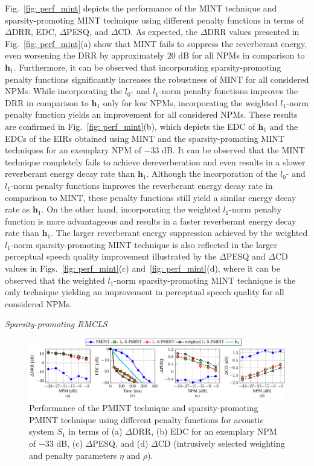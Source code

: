 \documentclass[10pt]{IEEEtran}
\begin{document}
Fig.~\ref{fig: perf_mint} depicts the performance of the MINT technique and sparsity-promoting MINT technique using different penalty functions in terms of $\Delta$DRR, EDC, $\Delta$PESQ, and $\Delta$CD. 
As expected, the $\Delta$DRR values presented in Fig.~\ref{fig: perf_mint}(a) show that MINT fails to suppress the reverberant energy, even worsening the DRR by approximately $20$ dB for all NPMs in comparison to $\mathbf{h}_1$. 
Furthermore, it can be observed that incorporating sparsity-promoting penalty functions significantly increases the robustness of MINT for all considered NPMs.
While incorporating the $l_0$- and $l_1$-norm penalty functions improves the DRR in comparison to $\mathbf{h}_1$ only for low NPMs, incorporating the weighted $l_1$-norm penalty function yields an improvement for all considered NPMs.
These results are confirmed in Fig.~\ref{fig: perf_mint}(b), which depicts the EDC of $\mathbf{h}_1$ and the EDCs of the EIRs obtained using MINT and the sparsity-promoting MINT techniques for an exemplary NPM of $-33$ dB.
It can be observed that the MINT technique completely fails to achieve dereverberation and even results in a slower reverberant energy decay rate than $\mathbf{h}_1$. 
Although the incorporation of the $l_0$- and $l_1$-norm penalty functions improves the reverberant energy decay rate in comparison to MINT, these penalty functions still yield a similar energy decay rate as $\mathbf{h}_1$.
On the other hand, incorporating the weighted $l_1$-norm penalty function is more advantageous and results in a faster reverberant energy decay rate than $\mathbf{h}_1$.
The larger reverberant energy suppression achieved by the weighted $l_1$-norm sparsity-promoting MINT technique is also reflected in the larger perceptual speech quality improvement illustrated by the $\Delta$PESQ and $\Delta$CD values in Figs.~\ref{fig: perf_mint}(c) and~\ref{fig: perf_mint}(d), where it can be observed that the weighted $l_1$-norm sparsity-promoting MINT technique is the only technique yielding an improvement in perceptual speech quality for all considered NPMs.

\vskip 5pt
{\textit{Sparsity-promoting RMCLS}}
\vskip 5pt
\begin{figure}[t!]
\centering
\includegraphics[scale=0.9]{Plots/perf_pmint}
\caption{Performance of the PMINT technique and sparsity-promoting PMINT technique using different penalty functions for acoustic system $S_1$ in terms of (a) $\Delta$DRR, (b) EDC for an exemplary NPM of $-33$ dB, (c) $\Delta$PESQ, and (d) $\Delta$CD (intrusively selected weighting and penalty parameters $\eta$ and $\rho$).}
\label{fig: perf_pmint}
\end{figure}
\end{document}
